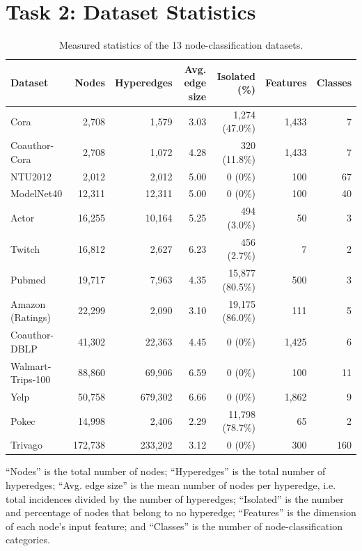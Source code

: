 \documentclass[11pt,a4paper]{article}
\begin{document}
\section*{Task 2: Dataset Statistics}
\begin{table}[H]
\centering\small
\begin{tabular}{lrrrrrr}
\toprule
Dataset & Nodes & Hyperedges & Avg. edge size & Isolated (\%) & Features & Classes \\
\midrule
Cora              & 2{,}708 & 1{,}579 & 3.03 & 1{,}274 (47.0\%) & 1{,}433 & 7 \\
Coauthor-Cora     & 2{,}708 & 1{,}072 & 4.28 & 320 (11.8\%) & 1{,}433 & 7 \\
NTU2012           & 2{,}012 & 2{,}012 & 5.00 & 0 (0\%) & 100 & 67 \\
ModelNet40        & 12{,}311 & 12{,}311 & 5.00 & 0 (0\%) & 100 & 40 \\
Actor             & 16{,}255 & 10{,}164 & 5.25 & 494 (3.0\%) & 50 & 3 \\
Twitch            & 16{,}812 & 2{,}627 & 6.23 & 456 (2.7\%) & 7 & 2 \\
Pubmed            & 19{,}717 & 7{,}963 & 4.35 & 15{,}877 (80.5\%) & 500 & 3 \\
Amazon (Ratings)  & 22{,}299 & 2{,}090 & 3.10 & 19{,}175 (86.0\%) & 111 & 5 \\
Coauthor-DBLP     & 41{,}302 & 22{,}363 & 4.45 & 0 (0\%) & 1{,}425 & 6 \\
Walmart-Trips-100 & 88{,}860 & 69{,}906 & 6.59 & 0 (0\%) & 100 & 11 \\
Yelp              & 50{,}758 & 679{,}302 & 6.66 & 0 (0\%) & 1{,}862 & 9 \\
Pokec             & 14{,}998 & 2{,}406 & 2.29 & 11{,}798 (78.7\%) & 65 & 2 \\
Trivago           & 172{,}738 & 233{,}202 & 3.12 & 0 (0\%) & 300 & 160 \\
\bottomrule
\end{tabular}
\caption{Measured statistics of the 13 node-classification datasets.}
\label{tab:datasets}
\end{table}
\par{ ``Nodes'' is the total number of nodes; ``Hyperedges'' is the total number of hyperedges; ``Avg. edge size'' is the mean number of nodes per hyperedge, i.e. total incidences divided by the number of hyperedges; ``Isolated'' is the number and percentage of nodes that belong to no hyperedge; ``Features'' is the dimension of each node's input feature; and ``Classes'' is the number of node-classification categories.}
\end{document}

